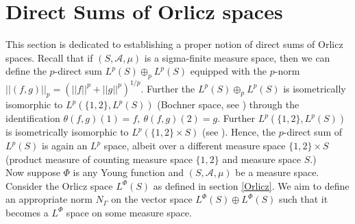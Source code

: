 \documentclass[pdflatex,sn-mathphys-num]{sn-jnl}%
\theoremstyle{thmstyleone}%
\theoremstyle{thmstyletwo}%
\theoremstyle{thmstylethree}%
\begin{document}
\section{Direct Sums of Orlicz spaces}
This section is dedicated to establishing a proper notion of direct sums of Orlicz spaces. Recall that if $(S,\mathcal A, \mu)$ is a sigma-finite measure space, then we can define the $p$-direct sum $L^p(S)\oplus_p L^p(S)$ equipped with the $p$-norm $||(f,g)||_p=\left(||f||^p+||g||^p\right)^{1/p}.$ Further the $L^p(S)\oplus_p L^p(S)$ is isometrically isomorphic to $L^p\left(\{1,2\}, L^p(S)\right)$ (Bochner space, see \cite[1.2b]{Hytonen}) through the identification
$\theta(f,g)(1)=f,~\theta(f,g)(2)=g$. Further $L^p\left(\{1,2\}, L^p(S)\right)$ is isometrically isomorphic to $L^p(\{1,2\}\times S)$ (see \cite[Prop. 1.2.24]{Hytonen}). Hence, the $p$-direct sum of $L^p(S)$ is again an $L^p$ space, albeit over a different measure space $\{1,2\}\times S$ (product measure of counting measure space $\{1,2\}$ and measure space $S$.)\\
Now suppose $\Phi$ is any Young function and $(S,\mathcal A,\mu)$ be a measure space. Consider the Orlicz space $L^\Phi(S)$ as defined in section \ref{Orlicz}. We aim to define an appropriate norm $N_\Gamma$ on the vector space $L^\Phi(S)\oplus L^\Phi(S)$ such that it becomes a $L^\Phi$ space on some measure space.\\
\end{document}
